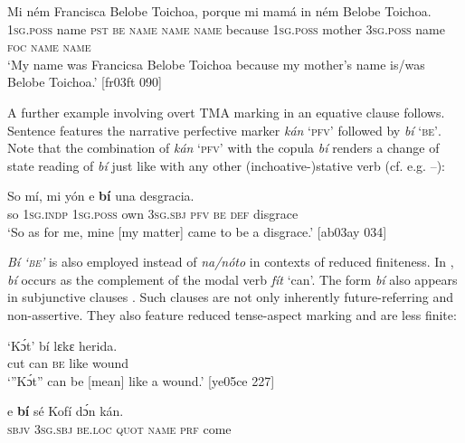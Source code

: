 \ea%
    \label{ex:key:773}
    \gll Mi    ném       Francisca  Belobe  Toichoa,    porque
mi    mamá  in    ném     Belobe  Toichoa.\\
\textsc{1sg.poss}  name  \textsc{pst}  \textsc{be}  \textsc{name}    \textsc{name}  \textsc{name}    because
\textsc{1sg.poss}  mother  \textsc{3sg.poss}  name  \textsc{foc}  \textsc{name}  \textsc{name}\\

\glt ‘My name was Francicsa Belobe Toichoa because my mother’s name 
is/was Belobe Toichoa.’ [fr03ft 090]
\z

A further example involving overt TMA marking in an equative clause follows. Sentence  features the narrative perfective marker \textit{kán} ‘\textsc{pfv}’ followed by \textit{bí} ‘\textsc{be’}. Note that the combination of\textit{ kán} ‘\textsc{pfv}’ with the copula \textit{bí} renders a change of state reading of \textit{bí} just like with any other (inchoative-)stative verb (cf. e.g. –): 


\ea%
    \label{ex:key:774}
    \gll So  mí,    mi    yón     e      \textbf{bí}  una  desgracia.\\
so  \textsc{1sg.indp}  \textsc{1sg.poss}  own    \textsc{3sg.sbj}  \textsc{pfv}  \textsc{be}  \textsc{def}  disgrace\\

\glt ‘So as for me, mine [my matter] came to be a disgrace.’ [ab03ay 034]
\z

\textit{Bí} \textit{\textsc{‘be’}} is also employed instead of \textit{na}\textit{\textup{/}}\textit{nóto} in contexts of reduced finiteness. In , \textit{bí} occurs as the complement of the modal verb \textit{fít} ‘can’. The form \textit{bí} also appears in subjunctive clauses . Such clauses are not only inherently future-referring and non-assertive. They also feature reduced tense-aspect marking and are less finite:


\ea%
    \label{ex:key:775}
    \gll ‘Kɔ́t’      bí  lɛkɛ    herida.\\
cut    can  \textsc{be}  like    wound\\

\glt ‘”Kɔ́t” can be [mean] like a wound.’ [ye05ce 227]
\z


\ea%
    \label{ex:key:776}
    \gll {}    e    \textbf{bí}    sé    Kofí    dɔ́n    kán.\\
\textsc{sbjv}    \textsc{3sg.sbj}  \textsc{be.loc}  \textsc{quot}    \textsc{name}  \textsc{prf}    come\\

